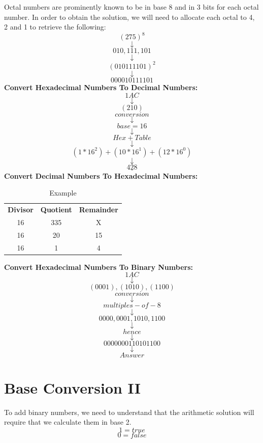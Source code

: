 \documentclass{article}
\begin{document}
\section*{}
Octal numbers are prominently known to be in base 8 and in 3 bits for each octal number. In order to obtain the solution, we will need to allocate each octal to 4, 2 and 1 to retrieve the following:
$$(275)^8$$
$$\downarrow$$
$$010, 111, 101$$
$$\downarrow$$
$$(010111101)^2$$
$$\downarrow$$
$$000010111101$$
\newline
\textbf{Convert Hexadecimal Numbers To Decimal Numbers:}
$$1AC$$
$$\downarrow$$
$$(210)$$
$$conversion$$
$$\downarrow$$
$$base=16$$
$$\downarrow$$
$$Hex+Table$$
$$\downarrow$$
$$(1*16^2)+(10*16^1)+(12*16^0)$$
$$\downarrow$$
$$\underline{428}$$
\newpage
\textbf{Convert Decimal Numbers To Hexadecimal Numbers:}
\begin{table}[h!]
    \centering
    \begin{tabular}{|c|c|c|}
        \textbf{Divisor} & \textbf{Quotient} & \textbf{Remainder} \\
        16 & 335 & X \\
        16 & 20 & 15 \\
        16 & 1 & 4  \\
        
    \end{tabular}
    \caption{Example}
    \label{tab:my_label}
\end{table}
\textbf{Convert Hexadecimal Numbers To Binary Numbers:}
$$1AC$$
$$\downarrow$$
$$(0001), (1010), (1100)$$
$$conversion$$
$$\downarrow$$
$$multiples-of-8$$
$$\downarrow$$
$$0000,0001,1010,1100$$
$$\downarrow$$
$$hence$$
$$\downarrow$$
$$0000000110101100$$
$$\downarrow$$
$$Answer$$

\newpage
\section{Base Conversion II}

To add binary numbers, we need to understand that the arithmetic solution will require that we calculate them in base 2.
$$1=true$$
$$0=false$$
\end{document}
